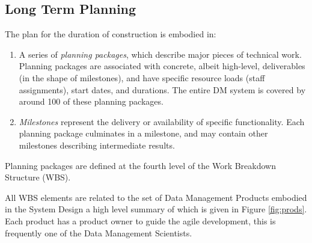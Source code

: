 \subsection{Long Term Planning}
\label{sec:long-term-plan}

The plan for the duration of construction is embodied in:

\begin{enumerate}
\item
  A series of \emph{planning packages}, which describe major pieces of
  technical work. Planning packages are associated with concrete, albeit
  high-level, deliverables (in the shape of milestones), and have
  specific resource loads (staff assignments), start dates, and
  durations. The entire DM system is covered by around 100 of these
  planning packages.
\item
  \emph{Milestones} represent the delivery or availability of specific
  functionality. Each planning package culminates in a milestone, and
  may contain other milestones describing intermediate results.
\end{enumerate}

Planning packages are defined at the fourth level of the Work Breakdown Structure (WBS).

All WBS elements are related to the set of Data Management Products embodied in the System Design \cite{LDM-148} a high level summary of which is given in
Figure \ref{fig:prods}. Each product has a product owner to guide the agile development, this is frequently one of the Data Management Scientists.

